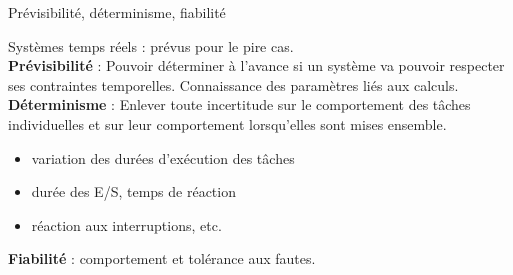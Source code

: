 %   
% 
%   
% 
% 


\begin{frame}{Prévisibilité, déterminisme, fiabilité}

  Systèmes temps réels : prévus pour le pire cas.\\[3mm]

  \textbf{Prévisibilité} : Pouvoir déterminer à l'avance si un système
  va pouvoir  respecter ses contraintes  temporelles. Connaissance des
  paramètres liés  aux calculs.\\[3mm]

  \textbf{Déterminisme}   :   Enlever   toute   incertitude   sur   le
  comportement  des  tâches  individuelles  et sur  leur  comportement
  lorsqu'elles sont mises ensemble.
  \begin{itemize}
  \item variation des durées d'exécution des tâches
  \item durée des E/S, temps de réaction
  \item réaction aux interruptions, etc.
  \end{itemize}

  \textbf{Fiabilité} : comportement et tolérance aux fautes.
\end{frame} 

